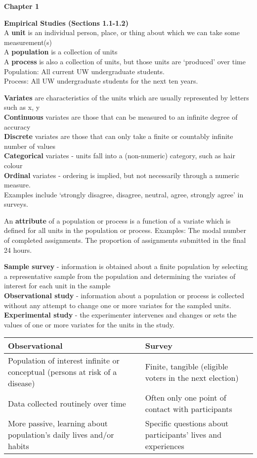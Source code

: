 \documentclass[a4paper,12pt]{article}
\begin{document}
\textbf{Chapter 1} 
\bigskip

\textbf{Empirical Studies (Sections 1.1-1.2)}
\bigskip
\\A \textbf{unit} is an individual person, place,
or thing about which we can take
some measurement(s)
\\A \textbf{population} is a collection of units
\\ A \textbf{process} is also a collection of units, but those units are
‘produced’ over time
\\Population: All current UW undergraduate students.
\\Process: All UW undergraduate students for the next ten years.
\bigskip

\textbf{Variates} are characteristics of the units which are usually
represented by letters such as x, y
\\\textbf{Continuous} variates are those that can be measured to an infinite degree of accuracy
\\\textbf{Discrete} variates are those that can only take a finite or countably infinite number of values
\\\textbf{Categorical} variates - units fall into a (non-numeric) category, such as hair colour 
\\\textbf{Ordinal} variates - ordering is implied, but not necessarily through a numeric measure. 
\\Examples include ‘strongly
disagree, disagree, neutral, agree, strongly agree’ in surveys.
\bigskip

An \textbf{attribute} of a population or process is a function of a variate
which is defined for all units in the population or process. Examples: The modal number of completed assignments.
The proportion of assignments submitted in the final 24 hours.
\bigskip

\textbf{Sample survey} - information is obtained about a finite population by selecting a representative sample from the
population and determining the variates of interest for each unit in the sample
\\\textbf{Observational study} - information about a population or process is collected without any attempt to change one or more
variates for the sampled units.
\\ \textbf{Experimental study} - the experimenter intervenes and changes or sets the values of one or more variates for the units in the study.

\begin{center}
\begin{tabular}{|p{5cm}|p{5cm}|}\hline
Observational  & Survey \\\hline
Population of interest infinite
or conceptual (persons at
risk of a disease) & 
Finite, tangible 
(eligible voters in the next election) \\\hline
Data collected routinely over
time & Often only one point of contact
with participants \\\hline
More passive, learning about
population’s daily lives and/or
habits & Specific questions about participants’ lives and experiences \\\hline
\end{tabular}
\end{center}
\end{document}
